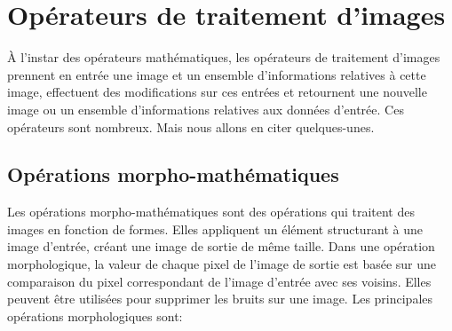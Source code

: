 \section{Opérateurs de traitement d'images}
À l’instar des opérateurs mathématiques, les opérateurs de traitement d’images prennent en entrée une image et un ensemble d’informations relatives à cette image, effectuent des modifications sur ces entrées et retournent une nouvelle image ou un ensemble d’informations relatives aux données d’entrée. Ces opérateurs sont nombreux. Mais nous allons en citer quelques-unes.
    \subsection{Opérations morpho-mathématiques}
Les opérations morpho-mathématiques sont des opérations qui traitent des images en fonction de formes. Elles appliquent un élément structurant à une image d'entrée, créant une image de sortie de même taille. Dans une opération morphologique, la valeur de chaque pixel de l'image de sortie est basée sur une comparaison du pixel correspondant de l'image d'entrée avec ses voisins. Elles peuvent être utilisées pour supprimer les bruits sur une image. Les principales opérations morphologiques sont:
